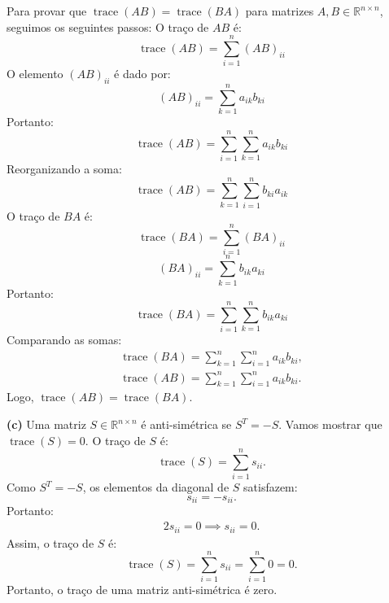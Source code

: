 \begin{resolution}
  Para provar que \( \operatorname{trace}(AB) = \operatorname{trace}(BA) \) para matrizes \( A, B \in \mathbb{R}^{n \times n} \), seguimos os seguintes passos:
  O traço de \( AB \) é:
  \begin{equation}
    \operatorname{trace}(AB) = \sum_{i=1}^n (AB)_{ii}
  \end{equation}
  O elemento \( (AB)_{ii} \) é dado por:
  \begin{equation}
    (AB)_{ii} = \sum_{k=1}^n a_{ik} b_{ki}
  \end{equation}
  Portanto:
  \begin{equation}
    \operatorname{trace}(AB) = \sum_{i=1}^n \sum_{k=1}^n a_{ik} b_{ki}
  \end{equation}
  Reorganizando a soma:
  \begin{equation}
    \operatorname{trace}(AB) = \sum_{k=1}^n \sum_{i=1}^n b_{ki} a_{ik}
  \end{equation}
  O traço de \( BA \) é:
  \begin{equation}
    \operatorname{trace}(BA) = \sum_{i=1}^n (BA)_{ii}
  \end{equation}
  \begin{equation}
    (BA)_{ii} = \sum_{k=1}^n b_{ik} a_{ki}
  \end{equation}
  Portanto:
  \begin{equation}
    \operatorname{trace}(BA) = \sum_{i=1}^n \sum_{k=1}^n b_{ik} a_{ki}
  \end{equation}
  Comparando as somas:
  \begin{gather}
    \operatorname{trace}(BA) = \sum_{k=1}^n \sum_{i=1}^n a_{ik} b_{ki}, \\
    \operatorname{trace}(AB) = \sum_{k=1}^n \sum_{i=1}^n a_{ik} b_{ki}.
  \end{gather}
  Logo, \( \operatorname{trace}(AB) = \operatorname{trace}(BA) \).

    {\bf (c)} Uma matriz \( S \in \mathbb{R}^{n \times n} \) é anti-simétrica se \( S^T = -S \). Vamos mostrar que \( \operatorname{trace}(S) = 0 \).
  O traço de \( S \) é:
  \begin{equation}
    \operatorname{trace}(S) = \sum_{i=1}^n s_{ii}.
  \end{equation}
  Como \( S^T = -S \), os elementos da diagonal de \( S \) satisfazem:
  \begin{equation}
    s_{ii} = -s_{ii}.
  \end{equation}
  Portanto:
  \begin{gather}
    2s_{ii} = 0 \implies s_{ii} = 0.
  \end{gather}
  Assim, o traço de \( S \) é:
  \begin{equation}
    \operatorname{trace}(S) = \sum_{i=1}^n s_{ii} = \sum_{i=1}^n 0 = 0.
  \end{equation}
  Portanto, o traço de uma matriz anti-simétrica é zero.


\end{resolution}
